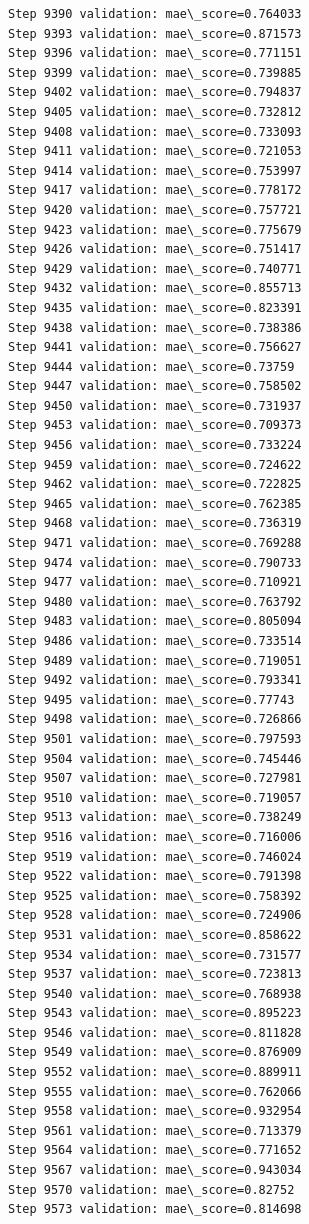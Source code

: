 \documentclass[11pt]{article}
\begin{document}
\begin{Verbatim}[commandchars=\\\{\}]
Step 9390 validation: mae\_score=0.764033
Step 9393 validation: mae\_score=0.871573
Step 9396 validation: mae\_score=0.771151
Step 9399 validation: mae\_score=0.739885
Step 9402 validation: mae\_score=0.794837
Step 9405 validation: mae\_score=0.732812
Step 9408 validation: mae\_score=0.733093
Step 9411 validation: mae\_score=0.721053
Step 9414 validation: mae\_score=0.753997
Step 9417 validation: mae\_score=0.778172
Step 9420 validation: mae\_score=0.757721
Step 9423 validation: mae\_score=0.775679
Step 9426 validation: mae\_score=0.751417
Step 9429 validation: mae\_score=0.740771
Step 9432 validation: mae\_score=0.855713
Step 9435 validation: mae\_score=0.823391
Step 9438 validation: mae\_score=0.738386
Step 9441 validation: mae\_score=0.756627
Step 9444 validation: mae\_score=0.73759
Step 9447 validation: mae\_score=0.758502
Step 9450 validation: mae\_score=0.731937
Step 9453 validation: mae\_score=0.709373
Step 9456 validation: mae\_score=0.733224
Step 9459 validation: mae\_score=0.724622
Step 9462 validation: mae\_score=0.722825
Step 9465 validation: mae\_score=0.762385
Step 9468 validation: mae\_score=0.736319
Step 9471 validation: mae\_score=0.769288
Step 9474 validation: mae\_score=0.790733
Step 9477 validation: mae\_score=0.710921
Step 9480 validation: mae\_score=0.763792
Step 9483 validation: mae\_score=0.805094
Step 9486 validation: mae\_score=0.733514
Step 9489 validation: mae\_score=0.719051
Step 9492 validation: mae\_score=0.793341
Step 9495 validation: mae\_score=0.77743
Step 9498 validation: mae\_score=0.726866
Step 9501 validation: mae\_score=0.797593
Step 9504 validation: mae\_score=0.745446
Step 9507 validation: mae\_score=0.727981
Step 9510 validation: mae\_score=0.719057
Step 9513 validation: mae\_score=0.738249
Step 9516 validation: mae\_score=0.716006
Step 9519 validation: mae\_score=0.746024
Step 9522 validation: mae\_score=0.791398
Step 9525 validation: mae\_score=0.758392
Step 9528 validation: mae\_score=0.724906
Step 9531 validation: mae\_score=0.858622
Step 9534 validation: mae\_score=0.731577
Step 9537 validation: mae\_score=0.723813
Step 9540 validation: mae\_score=0.768938
Step 9543 validation: mae\_score=0.895223
Step 9546 validation: mae\_score=0.811828
Step 9549 validation: mae\_score=0.876909
Step 9552 validation: mae\_score=0.889911
Step 9555 validation: mae\_score=0.762066
Step 9558 validation: mae\_score=0.932954
Step 9561 validation: mae\_score=0.713379
Step 9564 validation: mae\_score=0.771652
Step 9567 validation: mae\_score=0.943034
Step 9570 validation: mae\_score=0.82752
Step 9573 validation: mae\_score=0.814698

\end{Verbatim}
\end{document}
